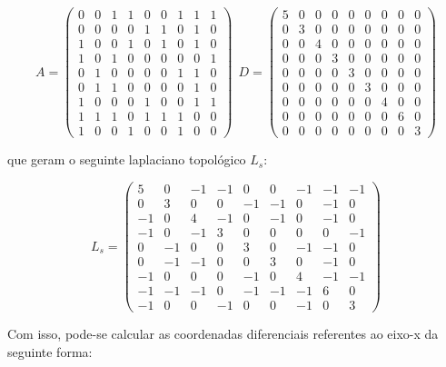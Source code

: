 $$A = \begin{pmatrix}
0 & 0 & 1 & 1 & 0 & 0 & 1 & 1 & 1\\
0 & 0 & 0 & 0 & 1 & 1 & 0 & 1 & 0\\
1 & 0 & 0 & 1 & 0 & 1 & 0 & 1 & 0\\
1 & 0 & 1 & 0 & 0 & 0 & 0 & 0 & 1\\
0 & 1 & 0 & 0 & 0 & 0 & 1 & 1 & 0\\
0 & 1 & 1 & 0 & 0 & 0 & 0 & 1 & 0\\
1 & 0 & 0 & 0 & 1 & 0 & 0 & 1 & 1\\
1 & 1 & 1 & 0 & 1 & 1 & 1 & 0 & 0\\
1 & 0 & 0 & 1 & 0 & 0 & 1 & 0 & 0
\end{pmatrix}\ \ D = \begin{pmatrix}
5 & 0 & 0 & 0 & 0 & 0 & 0 & 0 & 0\\
0 & 3 & 0 & 0 & 0 & 0 & 0 & 0 & 0\\
0 & 0 & 4 & 0 & 0 & 0 & 0 & 0 & 0\\
0 & 0 & 0 & 3 & 0 & 0 & 0 & 0 & 0\\
0 & 0 & 0 & 0 & 3 & 0 & 0 & 0 & 0\\
0 & 0 & 0 & 0 & 0 & 3 & 0 & 0 & 0\\
0 & 0 & 0 & 0 & 0 & 0 & 4 & 0 & 0\\
0 & 0 & 0 & 0 & 0 & 0 & 0 & 6 & 0\\
0 & 0 & 0 & 0 & 0 & 0 & 0 & 0 & 3
\end{pmatrix}$$

\noindent que geram o seguinte laplaciano topológico $L_s$:

$$L_s = \begin{pmatrix}
5 & 0 & -1 & -1 & 0 & 0 & -1 & -1 & -1\\
0 & 3 & 0 & 0 & -1 & -1 & 0 & -1 & 0\\
-1 & 0 & 4 & -1 & 0 & -1 & 0 & -1 & 0\\
-1 & 0 & -1 & 3 & 0 & 0 & 0 & 0 & -1\\
0 & -1 & 0 & 0 & 3 & 0 & -1 & -1 & 0\\
0 & -1 & -1 & 0 & 0 & 3 & 0 & -1 & 0\\
-1 & 0 & 0 & 0 & -1 & 0 & 4 & -1 & -1\\
-1 & -1 & -1 & 0 & -1 & -1 & -1 & 6 & 0\\
-1 & 0 & 0 & -1 & 0 & 0 & -1 & 0 & 3
\end{pmatrix}$$

Com isso, pode-se calcular as coordenadas diferenciais referentes ao eixo-x da seguinte forma:

